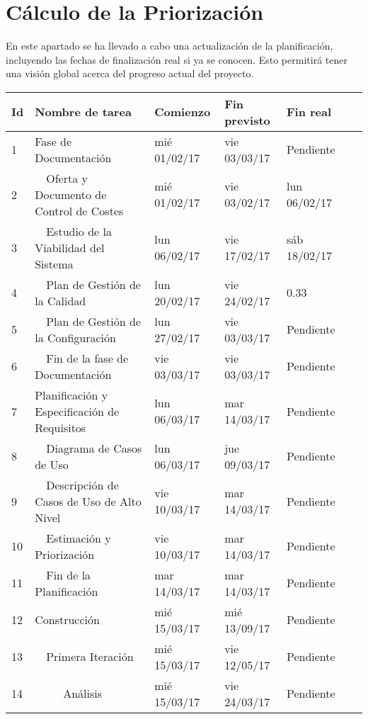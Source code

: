 \section{Cálculo de la Priorización}

 \par En este apartado se ha llevado a cabo una actualización de la planificación, incluyendo las fechas de finalización real si ya se conocen. Esto permitirá tener una visión global acerca del progreso actual del proyecto.

 \begin{center}
 \begin{longtable}{ l l l l l l}
	Id & Nombre de tarea & Comienzo & Fin previsto & Fin real & \  \\ \hline
	1 & Fase de Documentación & mié 01/02/17 & vie 03/03/17 & Pendiente & \  \\ \hline
	2 &   Oferta y Documento de Control de Costes & mié 01/02/17 & vie 03/02/17 & lun 06/02/17 &  \\ \hline
	3 &   Estudio de la Viabilidad del Sistema & lun 06/02/17 & vie 17/02/17 & sáb 18/02/17 & \  \\ \hline
	4 &   Plan de Gestión de la Calidad & lun 20/02/17 & vie 24/02/17 & 0.33 & \  \\ \hline
	5 &   Plan de Gestión de la Configuración & lun 27/02/17 & vie 03/03/17 & Pendiente & \  \\ \hline
	6 &   Fin de la fase de Documentación & vie 03/03/17 & vie 03/03/17 & Pendiente & \  \\ \hline
	7 & Planificación y Especificación de Requisitos & lun 06/03/17 & mar 14/03/17 & Pendiente & \  \\ \hline
	8 &   Diagrama de Casos de Uso & lun 06/03/17 & jue 09/03/17 & Pendiente & \  \\ \hline
	9 &   Descripción de Casos de Uso de Alto Nivel & vie 10/03/17 & mar 14/03/17 & Pendiente & \  \\ \hline
	10 &   Estimación y Priorización & vie 10/03/17 & mar 14/03/17 & Pendiente & \  \\ \hline
	11 &   Fin de la Planificación & mar 14/03/17 & mar 14/03/17 & Pendiente & \  \\ \hline
	12 & Construcción & mié 15/03/17 & mié 13/09/17 & Pendiente & \  \\ \hline
	13 &   Primera Iteración & mié 15/03/17 & vie 12/05/17 & Pendiente & \  \\ \hline
	14 &      Análisis & mié 15/03/17 & vie 24/03/17 & Pendiente & \  \\ \hline

\end{longtable}
\end{center}
